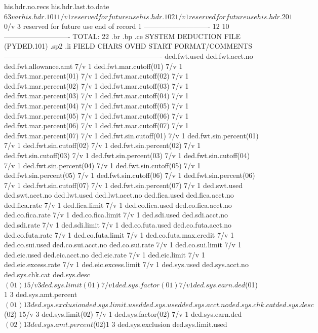 his.hdr.no.recs%
his.hdr.last.to.date$		6	3	var
his.hdr.101			1/v	1		reserved for future use
his.hdr.102			1/v	1		reserved for future use
his.hdr.201$			0/v	3		reserved for future use
end of record				1
			----------------------------
				12	10
			----------------------------
TOTAL:					22
.br
.bp
.ce
SYSTEM DEDUCTION FILE  (PYDED.101)
.sp2
.li
FIELD			CHARS	OVHD	START	FORMAT/COMMENTS
-------------------------------------------------------------------
ded.fwt.used%
ded.fwt.acct.no%
ded.fwt.allowance.amt	7/v	1
ded.fwt.mar.cutoff(01)	7/v	1
ded.fwt.mar.percent(01) 7/v	1
ded.fwt.mar.cutoff(02)	7/v	1
ded.fwt.mar.percent(02) 7/v	1
ded.fwt.mar.cutoff(03)	7/v	1
ded.fwt.mar.percent(03) 7/v	1
ded.fwt.mar.cutoff(04)	7/v	1
ded.fwt.mar.percent(04) 7/v	1
ded.fwt.mar.cutoff(05)	7/v	1
ded.fwt.mar.percent(05) 7/v	1
ded.fwt.mar.cutoff(06)	7/v	1
ded.fwt.mar.percent(06) 7/v	1
ded.fwt.mar.cutoff(07)	7/v	1
ded.fwt.mar.percent(07) 7/v	1
ded.fwt.sin.cutoff(01)	7/v	1
ded.fwt.sin.percent(01) 7/v	1
ded.fwt.sin.cutoff(02)	7/v	1
ded.fwt.sin.percent(02) 7/v	1
ded.fwt.sin.cutoff(03)	7/v	1
ded.fwt.sin.percent(03) 7/v	1
ded.fwt.sin.cutoff(04)	7/v	1
ded.fwt.sin.percent(04) 7/v	1
ded.fwt.sin.cutoff(05)	7/v	1
ded.fwt.sin.percent(05) 7/v	1
ded.fwt.sin.cutoff(06)	7/v	1
ded.fwt.sin.percent(06) 7/v	1
ded.fwt.sin.cutoff(07)	7/v	1
ded.fwt.sin.percent(07) 7/v	1
ded.swt.used%
ded.swt.acct.no%
ded.lwt.used%
ded.lwt.acct.no%
ded.fica.used%
ded.fica.acct.no%
ded.fica.rate		7/v	1
ded.fica.limit		7/v	1
ded.co.fica.used%
ded.co.fica.acct.no%
ded.co.fica.rate	7/v	1
ded.co.fica.limit	7/v	1
ded.sdi.used%
ded.sdi.acct.no%
ded.sdi.rate		7/v	1
ded.sdi.limit		7/v	1
ded.co.futa.used%
ded.co.futa.acct.no%
ded.co.futa.rate	7/v	1
ded.co.futa.limit	7/v	1
ded.co.futa.max.credit	7/v	1
ded.co.sui.used%
ded.co.sui.acct.no%
ded.co.sui.rate 	7/v	1
ded.co.sui.limit	7/v	1
ded.eic.used%
ded.eic.acct.no%
ded.eic.rate		7/v	1
ded.eic.limit		7/v	1
ded.eic.excess.rate	7/v	1
ded.eic.excess.limit	7/v	1
ded.sys.used%
ded.sys.acct.no%
ded.sys.chk.cat%
ded.sys.desc$(01)	15/v	3
ded.sys.limit(01)	7/v	1
ded.sys.factor(01)	7/v	1
ded.sys.earn.ded$(01)	1	3
ded.sys.amt.percent$(01)1	3
ded.sys.exclusion%
ded.sys.limit.used%
ded.sys.used%
ded.sys.acct.no%
ded.sys.chk.cat%
ded.sys.desc$(02)	15/v	3
ded.sys.limit(02)	7/v	1
ded.sys.factor(02)	7/v	1
ded.sys.earn.ded$(02)	1	3
ded.sys.amt.percent$(02)1	3
ded.sys.exclusion%
ded.sys.limit.used%
